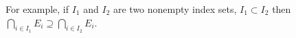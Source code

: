\documentclass[preview]{standalone}
\begin{document}
\begin{center}
For example, if $I_1$ and $I_2$ are two nonempty index sets, $I_1 \subset I_2$ then $\bigcap_{i \in I_1} E_i \supseteq \bigcap_{i \in I_2} E_i$.
\end{center}
\end{document}
